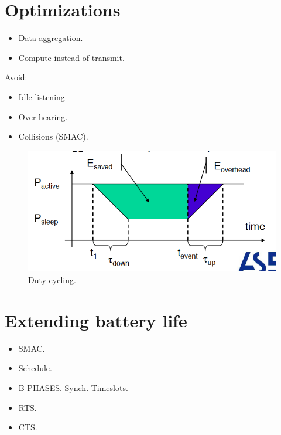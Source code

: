 \section{Optimizations}
\begin{itemize}
\item Data aggregation.
\item Compute instead of transmit.
\end{itemize}
Avoid:
\begin{itemize}
\item Idle listening
\item Over-hearing.
\item Collisions (SMAC).
\end{itemize}
\begin{figure}[H]
  \centering
    \includegraphics[scale=0.5,trim={20 10 27 20},clip=true]{img/EnergySources-DutyCycling.png}
    \caption{Duty cycling.}
\end{figure}


\section{Extending battery life}

\begin{itemize}
\item SMAC.
\item Schedule.
\item B-PHASES. Synch. Timeslots.
\item RTS.
\item CTS.
\end{itemize}

